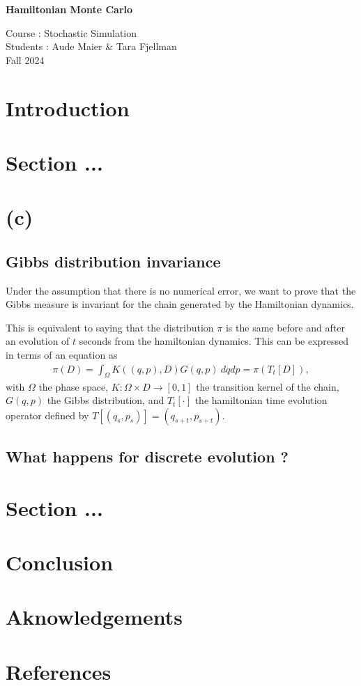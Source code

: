 \documentclass[a4paper, 12pt,oneside]{article}
\begin{document}
 
	\begin{center}
	    \Large
	    \textbf{Hamiltonian Monte Carlo} 
	    \vspace{0.4cm}
	    \large

		Course : Stochastic Simulation \\
	    Students : Aude Maier \& Tara Fjellman \\
	    \small{Fall 2024}
	\end{center}

	\section{Introduction}
	\section{Section ...}
	\section{(c)}
        \subsection{Gibbs distribution invariance}
		Under the assumption that there is no numerical error, we want to prove that the Gibbs measure is invariant for the chain generated by the Hamiltonian dynamics.

		This is equivalent to saying that the distribution $\pi$ is the same before and after an evolution of $t$ seconds from the hamiltonian dynamics. This can be expressed in terms of an equation as 
		\begin{gather}
			\pi(D)=\int_{\Omega} K((q,p),D) G(q,p) \ dq dp=\pi(T_t[D]),
		\end{gather}
		with $\Omega$ the phase space, $K:\Omega \times D\to [0,1]$ the transition kernel of the chain, $G(q,p)$ the Gibbs distribution, and $T_t[\cdot]$ the hamiltonian time evolution operator defined by $T[(q_s,p_s)]=(q_{s+t},p_{s+t})$.
        \subsection{What happens for discrete evolution ?}
	\section{Section ...}
	\section{Conclusion}
	\section*{Aknowledgements}
	\section*{References}
\end{document}
